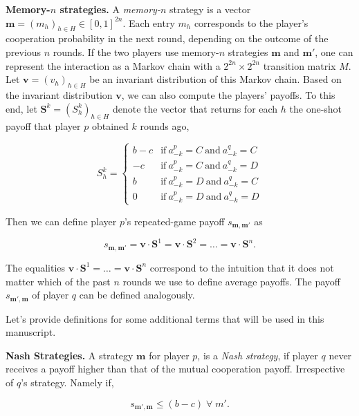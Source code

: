 \documentclass{article}
\theoremstyle{definition}
\begin{document}
{\bf Memory-$n$ strategies.} A {\it memory-$n$} strategy is a vector
$\mathbf{m}=(m_h)_{h\in H}\in[0,1]^{2n}$. Each entry $m_h$ corresponds to the
player's cooperation probability in the next round, depending on the outcome of
the previous $n$ rounds. If the two players use memory-$n$ strategies
$\mathbf{m}$ and $\mathbf{m'}$, one can represent the interaction as a Markov
chain with a $2^{2n}\!\times\!2^{2n}$ transition matrix $M$. Let
$\mathbf{v}=(v_h)_{h\in H}$ be an invariant distribution of this Markov chain.
Based on the invariant distribution $\mathbf{v}$, we can also compute the
players' payoffs. To this end, let $\mathbf{S}^k = (S_h^k)_{h\in H}$ denote the
vector that returns for each $h$ the one-shot payoff that player $p$ obtained
$k$ rounds ago,

\begin{equation}
    S_h^k = \left\{
    \begin{array}{cl}
    b-c	&\text{if}~ a_{-k}^p=C~\text{and}~ a_{-k}^q=C\\
    -c	&\text{if}~ a_{-k}^p=C~\text{and}~ a_{-k}^q=D\\
    b	&\text{if}~ a_{-k}^p=D~\text{and}~ a_{-k}^q=C\\
    0	&\text{if}~ a_{-k}^p=D~\text{and}~ a_{-k}^q=D
    \end{array}
    \right.
\end{equation}

Then we can define player $p$'s repeated-game payoff $s_{\mathbf{m},\mathbf{m'}}$ as

\begin{equation} \label{Eq:Payoff}
s_{\mathbf{m},\mathbf{m'}}  = \mathbf{v}\cdot \mathbf{S}^1 = \mathbf{v}\cdot \mathbf{S}^2 = \ldots = \mathbf{v} \cdot \mathbf{S}^n.
\end{equation}

The equalities $\mathbf{v}\cdot \mathbf{S}^1 = \ldots = \mathbf{v} \cdot
\mathbf{S}^n$ correspond to the intuition that it does not matter which of the
past $n$ rounds we use to define average payoffs. The payoff
$s_{\mathbf{m'},\mathbf{m}}$ of player $q$ can be defined analogously.

Let's provide definitions for some additional terms that will be used in this
manuscript.

{\bf Nash Strategies.} A strategy $\mathbf{m}$ for player $p$, is a \textit{Nash
strategy}, if player $q$ never receives a payoff higher than that of the mutual
cooperation payoff. Irrespective of $q$'s strategy. Namely if,

\begin{equation}\label{Eq:Nash}
    s_{\mathbf{m'},\mathbf{m}} \leq (b - c) \; \forall \; m'.
\end{equation}
\end{document}
